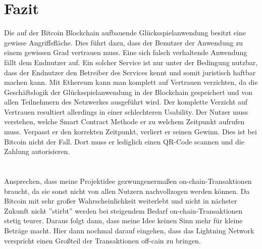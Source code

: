 \chapter{Fazit} %

Die auf der Bitcoin Blockchain aufbauende Glücksspielanwendung besitzt eine gewisse Angriffsfläche. Dies führt dazu, dass der Benutzer der Anwendung zu einem gewissen Grad vertrauen muss. Eine sich falsch verhaltende Anwendung fällt dem Endnutzer auf. Ein solcher Service ist nur unter der Bedingung nutzbar, dass der Endnutzer den Betreiber des Services kennt und somit juristisch haftbar machen kann. 
Mit Ethereum kann man komplett auf Vertrauen verzichten, da die Geschäftslogik der Glücksspielanwendung in der Blockchain gespeichert und von allen Teilnehmern des Netzwerkes ausgeführt wird. Der komplette Verzicht auf Vertrauen resultiert allerdings in einer schlechteren Usability. Der Nutzer muss verstehen, welche Smart Contract Methode er zu welchem Zeitpunkt aufrufen muss. Verpasst er den korrekten Zeitpunkt, verliert er seinen Gewinn. Dies ist bei Bitcoin nicht der Fall. Dort muss er lediglich einen QR-Code scannen und die Zahlung autorisieren.
\\\\\\
Ansprechen, dass meine Projektidee gezwungenermaßen on-chain-Transaktionen braucht, da sie sonst nicht von allen Nutzern nachvollzogen werden können. Da Bitcoin mit sehr großer Wahrscheinlichkeit weiterlebt und nicht in nächster Zukunft nicht ''stirbt'' werden bei steigendem Bedarf on-chain-Transaktionen stetig teurer. Daraus folgt dann, dass meine Idee keinen Sinn mehr für kleine Beträge macht. Hier dann nochmal darauf eingehen, dass das Lightning Network verspricht einen Großteil der Transaktionen off-cain zu bringen.
